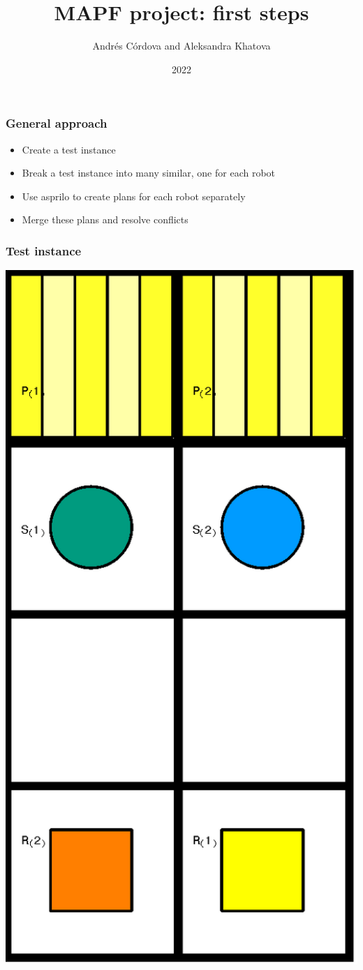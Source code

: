 \documentclass{beamer}
\title{MAPF project: first steps}
\author{Andrés Córdova and Aleksandra Khatova}
\institute{Unversity of Potsdam}
\date{2022}
\begin{document}
\frame{\titlepage}

\begin{frame}
\frametitle{General approach}
\begin{itemize} 
\item<1-> Create a test instance
\item<2-> Break a test instance into many similar, one for each robot
\item<3-> Use asprilo to create plans for each robot separately
\item<4-> Merge these plans and resolve conflicts
\end{itemize} 
\end{frame}

\begin{frame}
\frametitle{Test instance}
\centering
\includegraphics[scale=0.2]{x3y2r1s2p2.png}
\end{frame}
\end{document}
